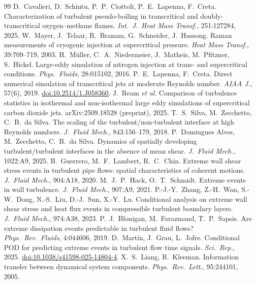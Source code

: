 \documentclass[11pt]{article}
\begin{document}
\begin{thebibliography}{99}
 D.\ Cavalieri, D.\ Schintu, P.\ P.\ Ciottoli, P.\ E.\ Lapenna, F.\ Creta. Characterization of turbulent pseudo-boiling in transcritical and doubly-transcritical oxygen--methane flames. \emph{Int.\ J.\ Heat Mass Transf.}, 251:127284, 2025.
 W.\ Mayer, J.\ Telaar, R.\ Branam, G.\ Schneider, J.\ Hussong. Raman measurements of cryogenic injection at supercritical pressure. \emph{Heat Mass Transf.}, 39:709--719, 2003.
 H.\ M\"uller, C.\ A.\ Niedermeier, J.\ Matheis, M.\ Pfitzner, S.\ Hickel. Large-eddy simulation of nitrogen injection at trans- and supercritical conditions. \emph{Phys.\ Fluids}, 28:015102, 2016.
 P.\ E.\ Lapenna, F.\ Creta. Direct numerical simulation of transcritical jets at moderate Reynolds number. \emph{AIAA J.}, 57(6), 2019. \href{https://doi.org/10.2514/1.J058360}{doi:10.2514/1.J058360}.
 J.\ Ream \emph{et al.} Comparison of turbulence statistics in isothermal and non-isothermal large eddy simulations of supercritical carbon dioxide jets. arXiv:2509.18528 (preprint), 2025.
 T.\ S.\ Silva, M.\ Zecchetto, C.\ B.\ da Silva. The scaling of the turbulent/non-turbulent interface at high Reynolds numbers. \emph{J.\ Fluid Mech.}, 843:156--179, 2018.
 P.\ Domingues Alves, M.\ Zecchetto, C.\ B.\ da Silva. Dynamics of spatially developing turbulent/turbulent interfaces in the absence of mean shear. \emph{J.\ Fluid Mech.}, 1022:A9, 2025.
 B.\ Guerrero, M.\ F.\ Lambert, R.\ C.\ Chin. Extreme wall shear stress events in turbulent pipe flows: spatial characteristics of coherent motions. \emph{J.\ Fluid Mech.}, 904:A18, 2020.
 M.\ J.\ P.\ Hack, O.\ T.\ Schmidt. Extreme events in wall turbulence. \emph{J.\ Fluid Mech.}, 907:A9, 2021.
 P.-J.-Y.\ Zhang, Z.-H.\ Wan, S.-W.\ Dong, N.-S.\ Liu, D.-J.\ Sun, X.-Y.\ Lu. Conditional analysis on extreme wall shear stress and heat flux events in compressible turbulent boundary layers. \emph{J.\ Fluid Mech.}, 974:A38, 2023.
 P.\ J.\ Blonigan, M.\ Farazmand, T.\ P.\ Sapsis. Are extreme dissipation events predictable in turbulent fluid flows? \emph{Phys.\ Rev.\ Fluids}, 4:044606, 2019.
 D.\ Mart\'in, J.\ Grau, L.\ Jofre. Conditional POD for predicting extreme events in turbulent flow time signals. \emph{Sci.\ Rep.}, 2025. \href{https://doi.org/10.1038/s41598-025-14804-4}{doi:10.1038/s41598-025-14804-4}.
 X.\ S.\ Liang, R.\ Kleeman. Information transfer between dynamical system components. \emph{Phys.\ Rev.\ Lett.}, 95:244101, 2005.

\end{thebibliography}
\end{document}
